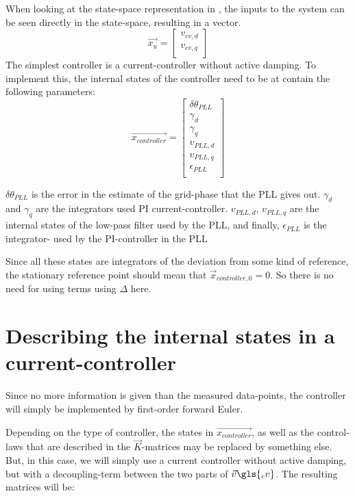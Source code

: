 When looking at the state-space representation in \cite{Suul_paper_1}, the inputs to the system can be seen directly in the state-space, resulting in a vector.
\begin{equation}
 \Vec{x_u} = 
 \begin{bmatrix}
 v_{cv,d}\\ v_{cv,q}\\
 \end{bmatrix}{}
\end{equation}{}
The simplest controller is a current-controller without active damping. To implement this, the internal states of the controller need to be at contain the following parameters: 
\begin{equation}
 \Vec{x_{controller}} = 
 \begin{bmatrix}
 \delta\theta_{PLL} \\ \gamma_d \\ \gamma_q \\ v_{PLL,d} \\ v_{PLL,q} \\ \epsilon_{PLL} \\
 \end{bmatrix}{}
\end{equation}{}

$\delta\theta_{PLL}$ is the error in the estimate of the grid-phase that the \gls{PLL} gives out. $\gamma_d$ and $\gamma_q$ are the integrators used PI current-controller. $v_{PLL, d}$, $v_{PLL, q}$ are the internal states of the low-pass filter used by the \gls{PLL}, and finally, $\epsilon_{PLL}$ is the integrator- used by the PI-controller in the \gls{PLL}



Since all these states are integrators of the deviation from some kind of reference, the stationary reference point should mean that $\Vec{x}_{controller, 0} =0$. So there is no need for using terms using $\Delta$ here. 

\section{Describing the internal states in a current-controller}

Since no more information is given than the measured data-points, the controller will simply be implemented by first-order forward Euler. 

Depending on the type of controller, the states in $\Vec{x_{controller}}$, as well as the control-laws that are described in the $\Vec{K}$-matrices may be replaced by something else. But, in this case, we will simply use a current controller without active damping, but with a decoupling-term between the two parts of $\Vec{v}\gls{_cv}$. The resulting matrices will be:


